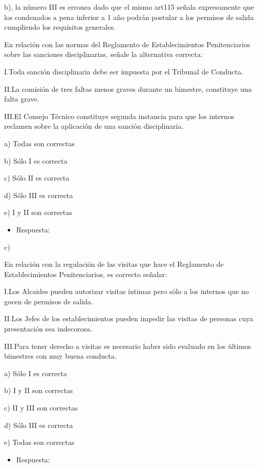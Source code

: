 \documentclass[letterpaper, 11pt]{article}
\begin{document}
b), la número III es erronea dado que el mismo art115 señala
expresamente que los condenados a pena inferior a 1 año podrán
postular a los permisos de salida cumpliendo los requisitos generales.

En relación con las normas del Reglamento de Establecimientos
Penitenciarios sobre las sanciones disciplinarias, señale la
alternativa correcta:


I.Toda sanción disciplinaria debe ser impuesta por el Tribunal de
Conducta.


II.La comisión de tres faltas menos graves durante un bimestre,
constituye una falta grave.

III.El Consejo Técnico constituye segunda instancia para que los
internos reclamen sobre la aplicación de una sanción disciplinaria.


a) Todas son correctas

b) Sólo I es correcta

c) Sólo II es correcta

d) Sólo III es correcta

e) I y II son correctas


\begin{itemize}
\item Respuesta:
\end{itemize}

c)


En relación con la regulación de las visitas que hace el Reglamento de
Establecimientos Penitenciarios, es correcto señalar:


I.Los Alcaides pueden autorizar visitas íntimas pero sólo a los
internos que no gocen de permisos de salida.



II.Los Jefes de los establecimientos pueden impedir las visitas de
personas cuya presentación sea indecorosa.



III.Para tener derecho a visitas es necesario haber sido evaluado en
los últimos bimestres con muy buena conducta.



a) Sólo I es correcta

b) I y II son correctas

c) II y III son correctas

d) Sólo III es correcta

e) Todas son correctas


\begin{itemize}
\item Respuesta:
\end{itemize}
\end{document}
